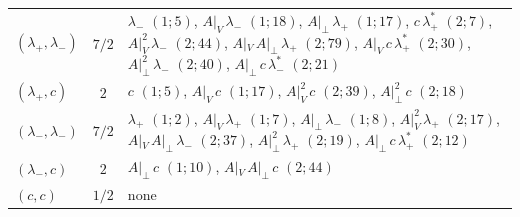 \documentclass[11pt]{article}
\numberwithin{equation}{section}
\theoremstyle{plain}
\theoremstyle{definition}
\begin{document}
\begin{longtable}{l|c|p{12.2cm}}
$(\lambda_+,\lambda_-)$ & $7/2$ & $\lambda_-$ $(1;5)$, $A|_V\,\lambda_-$ $(1;18)$, $A|_\perp\,\lambda_+$ $(1;17)$, $c\,\lambda^*_+$ $(2;7)$, $A|_V^{2}\,\lambda_-$ $(2;44)$, $A|_V\,A|_\perp\,\lambda_+$ $(2;79)$, $A|_V\,c\,\lambda^*_+$ $(2;30)$, $A|_\perp^{2}\,\lambda_-$ $(2;40)$, $A|_\perp\,c\,\lambda^*_-$ $(2;21)$\\
$(\lambda_+,c)$ & $2$ & $c$ $(1;5)$, $A|_V\,c$ $(1;17)$, $A|_V^{2}\,c$ $(2;39)$, $A|_\perp^{2}\,c$ $(2;18)$\\
$(\lambda_-,\lambda_-)$ & $7/2$ & $\lambda_+$ $(1;2)$, $A|_V\,\lambda_+$ $(1;7)$, $A|_\perp\,\lambda_-$ $(1;8)$, $A|_V^{2}\,\lambda_+$ $(2;17)$, $A|_V\,A|_\perp\,\lambda_-$ $(2;37)$, $A|_\perp^{2}\,\lambda_+$ $(2;19)$, $A|_\perp\,c\,\lambda^*_+$ $(2;12)$\\
$(\lambda_-,c)$ & $2$ & $A|_\perp\,c$ $(1;10)$, $A|_V\,A|_\perp\,c$ $(2;44)$\\
$(c,c)$ & $1/2$ & none\\
\end{longtable}
\end{document}
